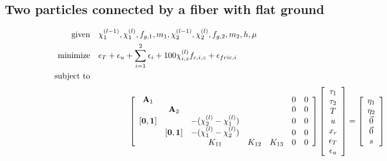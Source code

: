 \documentclass[a4paper,10pt]{article}
\begin{document}
\subsection{Two particles connected by a fiber with flat ground}
\begin{align}
\text{given}      & \quad \chi^{(l-1)}_1, \chi^{(l)}_1, f_{g,1}, m_1,
                          \chi^{(l-1)}_2, \chi^{(l)}_2, f_{g,2}, m_2,
                          h, \mu \notag\\
\text{minimize}   & \quad \epsilon_T + \epsilon_u + \sum_{i=1}^2 \epsilon_i + 100\chi^{(l)}_{i,z} f_{c,i,z} + \epsilon_{fric,i} \notag\\
\text{subject to} & \quad\quad\quad\quad\quad\quad\quad\quad\quad\quad\quad\quad\quad\quad\quad
\quad\quad\quad\quad\quad\quad\quad\quad\quad\quad\quad\quad\quad\quad\quad
\quad\quad\quad\quad\quad\quad\quad\quad\quad\quad\quad\quad\quad\quad\quad \notag
\end{align}
\begin{equation}
\left[\begin{array}{ccccccc}
\mathbf{A}_1                    &                                  &                                  &        &        &  0 & 0 \\
                                & \mathbf{A}_2                     &                                  &        &        &  0 & 0 \\
\space[ \mathbf{0},\mathbf{1} ] &                                  &  -(\chi^{(l)}_2 - \chi^{(l)}_1)  &        &        &  0 & 0 \\
                                & \space[ \mathbf{0},\mathbf{1} ]  &  -(\chi^{(l)}_1 - \chi^{(l)}_2)  &        &        &  0 & 0 \\
                                &                                  &                   K_{11}         & K_{12} & K_{13} &  0 & 0
\end{array}\right]
\left[\begin{array}{c}
\tau_1  \\
\tau_2  \\
T \\
u \\
x_r \\ 
\epsilon_T \\
\epsilon_u
\end{array}\right]
=
\left[\begin{array}{c}
\eta_1  \\
\eta_2  \\
\vec{0} \\
\vec{0} \\
s
\end{array}\right]
\end{equation}
\end{document}
